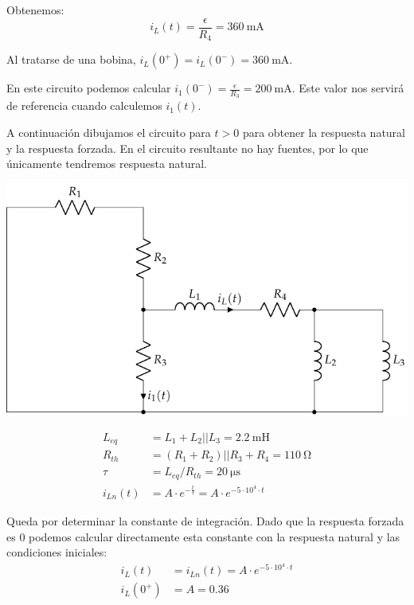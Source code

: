 \vspace{2mm}
Obtenemos:
\begin{equation*}
  i_L(t) = \frac{\epsilon}{R_4} = \SI{360}{\milli\ampere}
\end{equation*}

\vspace{3mm}
Al tratarse de una bobina,
$i_L(0^+) = i_L(0^-) = \SI{360}{\milli\ampere}$.

\vspace{3mm}
En este circuito podemos calcular
$i_1(0^-) = \frac{\epsilon}{R_3} = \SI{200}{\milli\ampere}$. Este
valor nos servirá de referencia cuando calculemos $i_1(t)$.

\vspace{3mm}
A continuación dibujamos el circuito para $t > 0$ para obtener la
respuesta natural y la respuesta forzada. En el circuito resultante no
hay fuentes, por lo que únicamente tendremos respuesta natural.

\begin{center}
  \includegraphics[scale=0.9]{figuras/HKD84_natural}
\end{center}

\vspace{-2mm}
  \begin{align*}
    L_{eq} &= L_1 + L_2||L_3 = \SI{2.2}{\milli\henry}\\
    R_{th} &= (R_1 + R_2) || R_3 + R_4  = \SI{110}{\ohm}\\
    \tau &= L_{eq}/R_{th} = \SI{20}{\micro\second}\\
    i_{Ln}(t) &= A \cdot e^{-\frac{t}{\tau}} = A \cdot e^{-5 \cdot 10^{4} \cdot t}
  \end{align*}

  Queda por determinar la constante de integración. Dado que la
  respuesta forzada es 0 podemos calcular directamente esta constante
  con la respuesta natural y las condiciones iniciales:
\begin{align*}
  i_L(t) &= i_{Ln}(t) = A \cdot e^{-5 \cdot 10^{4} \cdot t}\\
  i_L(0^+) &= A = 0.36
\end{align*}

